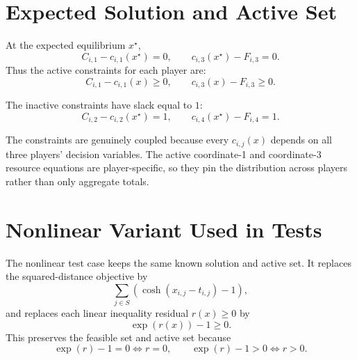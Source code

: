 \documentclass[11pt]{article}
\begin{document}
\section*{Expected Solution and Active Set}

At the expected equilibrium \(x^\star\),
\[
  C_{i,1} - c_{i,1}(x^\star) = 0,
  \qquad
  c_{i,3}(x^\star) - F_{i,3} = 0.
\]
Thus the active constraints for each player are:
\[
  C_{i,1} - c_{i,1}(x) \ge 0,
  \qquad
  c_{i,3}(x) - F_{i,3} \ge 0.
\]

The inactive constraints have slack equal to \(1\):
\[
  C_{i,2} - c_{i,2}(x^\star) = 1,
  \qquad
  c_{i,4}(x^\star) - F_{i,4} = 1.
\]

The constraints are genuinely coupled because every \(c_{i,j}(x)\) depends on
all three players' decision variables. The active coordinate-1 and coordinate-3
resource equations are player-specific, so they pin the distribution across
players rather than only aggregate totals.

\section*{Nonlinear Variant Used in Tests}

The nonlinear test case keeps the same known solution and active set. It replaces
the squared-distance objective by
\[
  \sum_{j \in S} \left(\cosh(x_{i,j}-t_{i,j}) - 1\right),
\]
and replaces each linear inequality residual \(r(x) \ge 0\) by
\[
  \exp(r(x)) - 1 \ge 0.
\]
This preserves the feasible set and active set because
\[
  \exp(r)-1 = 0 \iff r=0,
  \qquad
  \exp(r)-1 > 0 \iff r>0.
\]
\end{document}
